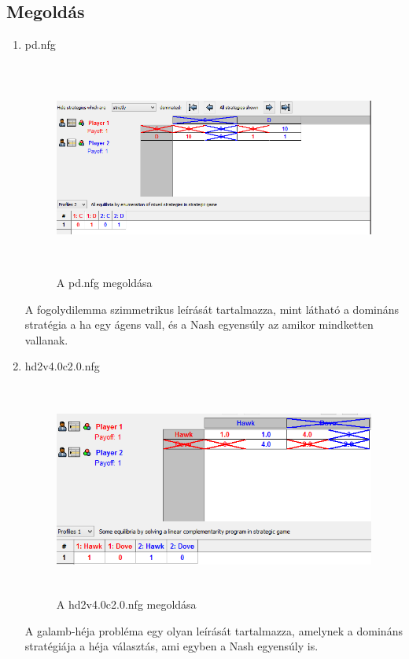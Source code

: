 \subsection{Megoldás}
\begin{enumerate}
\item pd.nfg
		\begin{figure}[!h]
		\begin{center}
		\includegraphics[height=7cm]{figures/pd_nfg_dom.png}
		\caption{A pd.nfg megoldása}
		\end{center}
		\end{figure}
A fogolydilemma szimmetrikus leírását tartalmazza, mint látható a domináns stratégia a ha egy ágens vall, és a Nash egyensúly az amikor mindketten vallanak.
		
\item hd2v4.0c2.0.nfg
		\begin{figure}[!h]
		\begin{center}
		\includegraphics[height=7cm]{figures/hd2v4_dom.png}
		\caption{A hd2v4.0c2.0.nfg megoldása}
		\end{center}
		\end{figure}
A galamb-héja probléma egy olyan leírását tartalmazza, amelynek a domináns stratégiája a héja választás, ami egyben a Nash egyensúly is.
		

\end{enumerate}
